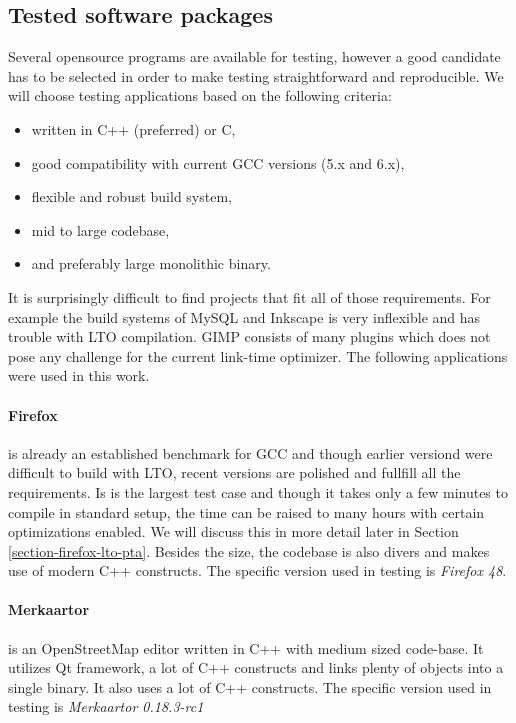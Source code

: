 \subsection{Tested software packages}

Several opensource programs are available for testing, however a good candidate has
to be selected in order to make testing straightforward and reproducible.
We will choose testing applications based on the following criteria:

\begin{itemize}
	\item written in C++ (preferred) or C,
	\item good compatibility with current GCC versions (5.x and 6.x),
	\item flexible and robust build system,
	\item mid to large codebase,
	\item and preferably large monolithic binary.
\end{itemize}

It is surprisingly difficult to find projects that fit all of those
requirements. For example the build systems of MySQL and Inkscape is very
inflexible and has trouble with LTO compilation. GIMP consists of many plugins
which does not pose any challenge for the current link-time optimizer. The
following applications were used in this work.

\paragraph{Firefox} is already an established benchmark for GCC \cite{glek2010}
and though earlier versiond were difficult to build with LTO, recent versions
are polished and fullfill all the requirements. Is is the largest test case and
though it takes only a few minutes to compile in standard setup, the time can be
raised to many hours with certain optimizations enabled. We will discuss this in
more detail later in Section \ref{section-firefox-lto-pta}. Besides the size,
the codebase is also divers and makes use of modern C++ constructs. The specific
version used in testing is {\it Firefox 48}.

\paragraph{Merkaartor} is an OpenStreetMap editor written in C++ with medium
sized code-base. It utilizes Qt framework, a lot of C++ constructs and links
plenty of objects into a single binary. It also uses a lot of C++ constructs.  The
specific version used in testing is {\it Merkaartor 0.18.3-rc1}

